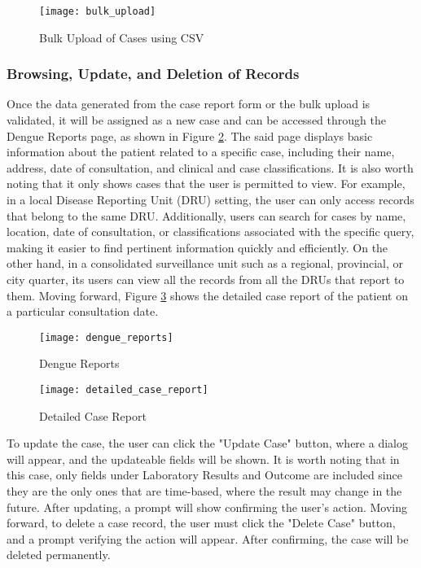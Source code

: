 \begin{figure}[H]
	\centering
	\texttt{[image: bulk\_upload]}
	\caption{Bulk Upload of Cases using CSV}
	\label{fig:bulk_upload}
\end{figure}

\subsubsection{Browsing, Update, and Deletion of Records}
Once the data generated from the case report form or the bulk upload is validated, it will be assigned as a new case and can be accessed through the Dengue Reports page, as shown in Figure \ref{fig:dengue_reports}. The said page displays basic information about the patient related to a specific case, including their name, address, date of consultation, and clinical and case classifications. It is also worth noting that it only shows cases that the user is permitted to view. For example, in a local Disease Reporting Unit (DRU) setting, the user can only access records that belong to the same DRU. Additionally, users can search for cases by name, location, date of consultation, or classifications associated with the specific query, making it easier to find pertinent information quickly and efficiently. On the other hand, in a consolidated surveillance unit such as a regional, provincial, or city quarter, its users can view all the records from all the DRUs that report to them. Moving forward, Figure \ref{fig:detailed_case_report} shows the detailed case report of the patient on a particular consultation date. 

\begin{figure}[H]
	\centering
	\texttt{[image: dengue\_reports]}
	\caption{Dengue Reports}
	\label{fig:dengue_reports}
\end{figure}
\begin{figure}[H]
	\centering
	\texttt{[image: detailed\_case\_report]}
	\caption{Detailed Case Report}
	\label{fig:detailed_case_report}
\end{figure}

To update the case, the user can click the "Update Case" button, where a dialog will appear, and the updateable fields will be shown. It is worth noting that in this case, only fields under Laboratory Results and Outcome are included since they are the only ones that are time-based, where the result may change in the future. After updating, a prompt will show confirming the user's action. Moving forward, to delete a case record, the user must click the "Delete Case" button, and a prompt verifying the action will appear. After confirming, the case will be deleted permanently.

